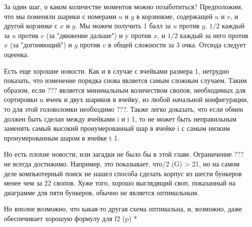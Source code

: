За один шаг, о каком количестве моментов можно позаботиться?
Предположим, что мы поменяли шарики с номерами $u$ и $y$ в корзинкме, содержащей $u$ и $v$, и другой корзинке с $x$ и $y$.
Мы можем получить 1 балл за $u$ против $y$, $1/2$ каждый за $u$ против $v$ (за "движение дальше") и y против $x$, и $1/2$ каждый за него против $x$ (за "догоняющий") и $y$ против $v$ в общей сложности за $3$ очка.
Отсюда следует оцеенка.

Есть еще хорошие новости.
Как и в случае с ячейками размера 1, нетрудно показать, что изменение порядка снова является самым сложным случаем. 
Таким образом, если ??? является минимальным количеством свопов, необходимых для сортировки n ячеек и двух шариков в ячейку, из любой начальной конфигурации, то для этой головоломки необходимо ???.
Также легко доказать, что если обмен должен быть сделан между ячейками i и i 1, то не может быть неправильным заменять самый высокий пронумерованный шар в ячейке i с самым низким пронумерованным шаром в ячейке t 1.

Но есть плохие новости, или загадки не было бы в этой главе.
Ограничение ??? не всегда достижимо.
Например, это показывает, что/2 (G) > 21, но на самом деле компьютерный поиск не нашел способа сделать корпус из шести бункеров менее чем за 22 свопов.
Хуже того, хорошо выглядящий своп, показанный на диаграмме для пяти бункеров, обычно не является оптимальным.

Но вполне возможно, что какая-то другая схема оптимальна, и, возможно, даже обеспечивает хорошую формулу для f2 (p) *
